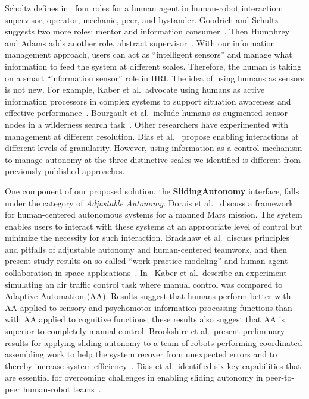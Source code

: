 Scholtz defines in~\cite{Steinfeld2006Common} four roles for a human agent in human-robot interaction: supervisor, operator, mechanic, peer, and bystander. Goodrich and Schultz suggests two more roles: mentor and information consumer~\cite{Goodrich2007HRISurvey}. Then Humphrey and Adams adds another role, abstract supervisor~\cite{Humphrey2009Information}. With our information management approach, users can act as ``intelligent sensors'' and manage what information to feed the system at different scales. Therefore, the human is taking on a smart ``information sensor'' role in HRI. The idea of using humans as sensors is not new. For example, Kaber et al.\ advocate using humans as active information processors in complex systems to support situation awareness and effective performance~\cite{Kaber2001Design}. Bourgault et al.\ include humans as augmented sensor nodes in a wilderness search task~\cite{Bourgault2008AugmentedNodes}. Other researchers have experimented with management at different resolution. Dias et al.\ \cite{Dias2008SlidingAutonomy} propose enabling interactions at different levels of granularity. However, using information as a control mechanism to manage autonomy at the three distinctive scales we identified is different from previously published approaches.

One component of our proposed solution, the \textbf{SlidingAutonomy} interface, falls under the category of \textit{Adjustable Autonomy}. Dorais et al.\ \cite{Dorais1998AdjustableAutonomy} discuss a framework for human-centered autonomous systems for a manned Mars mission. The system enables users to interact with these systems at an appropriate level of control but minimize the necessity for such interaction. Bradshaw et al.\ discuss principles and pitfalls of adjustable autonomy and human-centered teamwork, and then present study results on so-called ``work practice modeling'' and human-agent collaboration in space applications~\cite{Bradshaw2003AdjustableAutonomy}. In~\cite{Kaber2005Adaptive} Kaber et al.\ describe an experiment simulating an air traffic control task where manual control was compared to Adaptive Automation (AA). Results suggest that humans perform better with AA applied to sensory and psychomotor information-processing functions than with AA applied to cognitive functions; these results also suggest that AA is superior to completely manual control. Brookshire et al.\ present preliminary results for applying sliding autonomy to a team of robots performing coordinated assembling work to help the system recover from unexpected errors and to thereby increase system efficiency~\cite{Brookshire2004Preliminary}. Dias et al.\ identified six key capabilities that are essential for overcoming challenges in enabling sliding autonomy in peer-to-peer human-robot teams~\cite{Dias2008SlidingAutonomy}.

